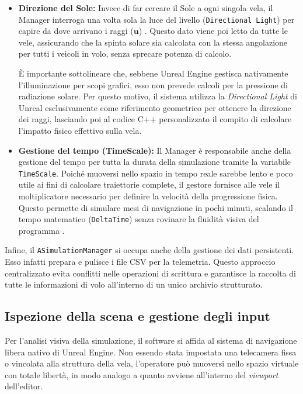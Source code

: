 \begin{itemize}
    \item \textbf{Direzione del Sole:} Invece di far cercare il Sole a ogni singola vela, il Manager interroga una volta sola la luce del livello (\lstinline|Directional Light|) per capire da dove arrivano i raggi ($\mathbf{u}$) \cite{epicgames_unrealengine}. Questo dato viene poi letto da tutte le vele, assicurando che la spinta solare sia calcolata con la stessa angolazione per tutti i veicoli in volo, senza sprecare potenza di calcolo.
    
    È importante sottolineare che, sebbene Unreal Engine gestisca nativamente l'illuminazione per scopi grafici, esso non prevede calcoli per la pressione di radiazione solare. Per questo motivo, il sistema utilizza la \textit{Directional Light} di Unreal esclusivamente come riferimento geometrico per ottenere la direzione dei raggi, lasciando poi al codice C++ personalizzato il compito di calcolare l'impatto fisico effettivo sulla vela.
    \item \textbf{Gestione del tempo (TimeScale):} Il Manager è responsabile anche della gestione del tempo per tutta la durata della simulazione tramite la variabile \lstinline|TimeScale|. Poiché muoversi nello spazio in tempo reale sarebbe lento e poco utile ai fini di calcolare traiettorie complete, il gestore fornisce alle vele il moltiplicatore necessario per definire la velocità della progressione fisica. Questo permette di simulare mesi di navigazione in pochi minuti, scalando il tempo matematico (\lstinline|DeltaTime|) senza rovinare la fluidità visiva del programma \cite{epicgames_unrealengine}.
\end{itemize}

Infine, il \lstinline|ASimulationManager| si occupa anche della gestione dei dati persistenti. Esso infatti prepara e pulisce i file CSV per la telemetria. Questo approccio centralizzato evita conflitti nelle operazioni di scrittura e garantisce la raccolta di tutte le informazioni di volo all'interno di un unico archivio strutturato.


\subsection{Ispezione della scena e gestione degli input}
Per l'analisi visiva della simulazione, il software si affida al sistema di navigazione libera nativo di Unreal Engine. Non essendo stata impostata una telecamera fissa o vincolata alla struttura della vela, l'operatore può muoversi nello spazio virtuale con totale libertà, in modo analogo a quanto avviene all'interno del \textit{viewport} dell'editor.

